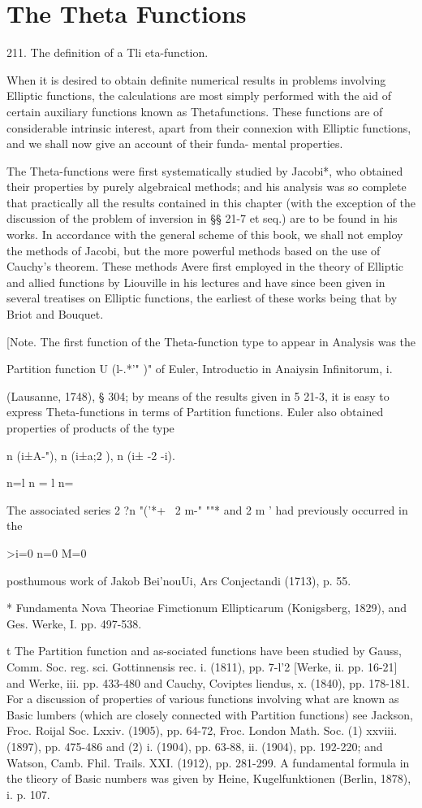 \chapter{The Theta Functions} 

211. The definition of a Tli eta-function.

When it is desired to obtain definite numerical results in problems
involving Elliptic functions, the calculations are most simply
performed with the aid of certain auxiliary functions known as
Thetafunctions. These functions are of considerable intrinsic
interest, apart from their connexion with Elliptic functions, and we
shall now give an account of their funda- mental properties.

The Theta-functions were first systematically studied by Jacobi*, who
obtained their properties by purely algebraical methods; and his
analysis was so complete that practically all the results contained in
this chapter (with the exception of the discussion of the problem of
inversion in §§ 21-7 et seq.) are to be found in his works. In
accordance with the general scheme of this book, we shall not employ
the methods of Jacobi, but the more powerful methods based on the use
of Cauchy's theorem. These methods Avere first employed in the theory
of Elliptic and allied functions by Liouville in his lectures and have
since been given in several treatises on Elliptic functions, the
earliest of these works being that by Briot and Bouquet.

[Note. The first function of the Theta-function type to appear in
Analysis was the

Partition function U (l-.*'" )" of Euler, Introductio in Anaiysin
Infinitorum, i.

(Lausanne, 1748), § 304; by means of the results given in 5 21-3, it
is easy to express Theta-functions in terms of Partition functions.
Euler also obtained properties of products of the type

n (i±A-"), n (i±a;2 ), n (i± -2 -i).

n=l n = l n=\

The associated series 2 ?n "('*+ \ 2 m-" ""* and 2 m ' had previously
occurred in the

>i=0 n=0 M=0

posthumous work of Jakob Bei'nouUi, Ars Conjectandi (1713), p. 55.

* Fundamenta Nova Theoriae Fimctionum Ellipticarum (Konigsberg, 1829),
and Ges. Werke, I. pp. 497-538.

t The Partition function and as-sociated functions have been studied
by Gauss, Comm. Soc. reg. sci. Gottinnensis rec. i. (1811), pp. 7-l'2
[Werke, ii. pp. 16-21] and Werke, iii. pp. 433-480 and Cauchy,
Coviptes liendus, x. (1840), pp. 178-181. For a discussion of
properties of various functions involving what are known as Basic
lumbers (which are closely connected with Partition functions) see
Jackson, Froc. Roijal Soc. Lxxiv. (1905), pp. 64-72, Froc. London
Math. Soc. (1) xxviii. (1897), pp. 475-486 and (2) i. (1904), pp.
63-88, ii. (1904), pp. 192-220; and Watson, Camb. Fhil. Trails. XXI.
(1912), pp. 281-299. A fundamental formula in the tlieory of Basic
numbers was given by Heine, Kugelfunktionen (Berlin, 1878), i. p. 107.


